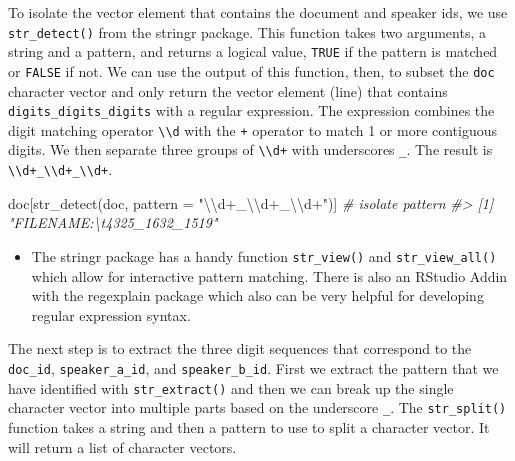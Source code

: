 \documentclass[
]{article}
\newenvironment{Shaded}{\begin{snugshade}}{\end{snugshade}}
\newcommand{\AttributeTok}[1]{\textcolor[rgb]{0.77,0.63,0.00}{#1}}
\newcommand{\CommentTok}[1]{\textcolor[rgb]{0.56,0.35,0.01}{\textit{#1}}}
\newcommand{\FunctionTok}[1]{\textcolor[rgb]{0.00,0.00,0.00}{#1}}
\newcommand{\NormalTok}[1]{#1}
\newcommand{\SpecialCharTok}[1]{\textcolor[rgb]{0.00,0.00,0.00}{#1}}
\newcommand{\StringTok}[1]{\textcolor[rgb]{0.31,0.60,0.02}{#1}}
\newenvironment{rmdblock}[1]
  {\begin{shaded*}
  \begin{itemize}
  \renewcommand{\labelitemi}{
    \raisebox{-.5\height}[0pt][0pt]{
      {\setkeys{Gin}{width=2em,keepaspectratio}\texttt{[image: assets/images/\#1]}}
    }
  }
  \item
  }
  {
  \end{itemize}
  \end{shaded*}
  }
\newenvironment{rmdtip}
  {\begin{rmdblock}{tip}}
  {\end{rmdblock}}
\begin{document}
To isolate the vector element that contains the document and speaker ids, we use \texttt{str\_detect()} from the stringr package. This function takes two arguments, a string and a pattern, and returns a logical value, \texttt{TRUE} if the pattern is matched or \texttt{FALSE} if not. We can use the output of this function, then, to subset the \texttt{doc} character vector and only return the vector element (line) that contains \texttt{digits\_digits\_digits} with a regular expression. The expression combines the digit matching operator \texttt{\textbackslash{}\textbackslash{}d} with the \texttt{+} operator to match 1 or more contiguous digits. We then separate three groups of \texttt{\textbackslash{}\textbackslash{}d+} with underscores \texttt{\_}. The result is \texttt{\textbackslash{}\textbackslash{}d+\_\textbackslash{}\textbackslash{}d+\_\textbackslash{}\textbackslash{}d+}.

\begin{Shaded}
\begin{Highlighting}[]
\NormalTok{doc[}\FunctionTok{str\_detect}\NormalTok{(doc, }\AttributeTok{pattern =} \StringTok{"}\SpecialCharTok{\textbackslash{}\textbackslash{}}\StringTok{d+\_}\SpecialCharTok{\textbackslash{}\textbackslash{}}\StringTok{d+\_}\SpecialCharTok{\textbackslash{}\textbackslash{}}\StringTok{d+"}\NormalTok{)]  }\CommentTok{\# isolate pattern}
\CommentTok{\#\textgreater{} [1] "FILENAME:\textbackslash{}t4325\_1632\_1519"}
\end{Highlighting}
\end{Shaded}

\begin{rmdtip}
The stringr package has a handy function \texttt{str\_view()} and
\texttt{str\_view\_all()} which allow for interactive pattern matching.
There is also an RStudio Addin with the regexplain package which also
can be very helpful for developing regular expression syntax.
\end{rmdtip}

The next step is to extract the three digit sequences that correspond to the \texttt{doc\_id}, \texttt{speaker\_a\_id}, and \texttt{speaker\_b\_id}. First we extract the pattern that we have identified with \texttt{str\_extract()} and then we can break up the single character vector into multiple parts based on the underscore \texttt{\_}. The \texttt{str\_split()} function takes a string and then a pattern to use to split a character vector. It will return a list of character vectors.
\end{document}

